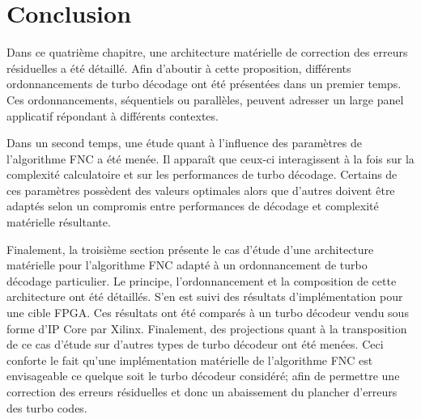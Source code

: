 \begin{table}[!t]
	\centering
	\caption{Récapitulatif des modifications requises par rapport à l'architecture de référence afin de l'adapter à 
	d'autres ordonnancements de turbo décodeurs.}
	\label{tab:fnc_recap}
\end{table}

\section{Conclusion}
Dans ce quatrième chapitre, une architecture matérielle de correction des erreurs résiduelles a été détaillé. 
Afin d'aboutir à cette proposition, différents ordonnancements de turbo décodage ont été présentées dans un premier temps.
Ces ordonnancements, séquentiels ou parallèles, peuvent adresser un large panel applicatif
répondant à différents contextes.

Dans un second temps, une étude quant à l'influence des paramètres de l'algorithme FNC a été menée. Il apparaît que 
ceux-ci interagissent à la fois sur la complexité calculatoire et sur les performances de turbo décodage.
Certains de ces paramètres possèdent des valeurs optimales alors que d'autres doivent être adaptés selon un
compromis entre performances de décodage et complexité matérielle résultante.

Finalement, la troisième section présente le cas d'étude d'une architecture matérielle pour l'algorithme FNC adapté à
un ordonnancement de turbo décodage particulier. Le principe, l'ordonnancement et la composition de cette architecture ont 
été détaillés. S'en est suivi des résultats d'implémentation pour une cible FPGA. Ces résultats ont été comparés à un 
turbo décodeur vendu sous forme d'IP Core par Xilinx. Finalement, des projections quant à la transposition de ce cas 
d'étude sur d'autres
types de turbo décodeur ont été menées. Ceci conforte le fait qu'une implémentation matérielle de l'algorithme FNC est
envisageable ce quelque soit le turbo décodeur considéré; afin de permettre une correction des erreurs résiduelles et
donc un abaissement du plancher d'erreurs des turbo codes.
